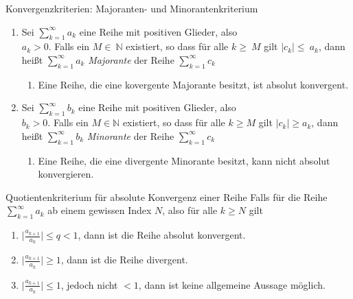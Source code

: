 \begin{karte}{Konvergenzkriterien: Majoranten- und Minorantenkriterium}
	\begin{enumerate}[label=\textbullet]

		\item Sei \(\sum_{k=1}^{\infty}a_k\) eine Reihe mit positiven Glieder, also \\ \( a_k > 0\). Falls ein \(M \in\ \mathbb{N}\) existiert, so dass für alle \(k \geq\ M\) gilt \(\lvert c_k\rvert \leq\ a_k\), dann heißt \(\sum_{k=1}^{\infty}a_k\) \emph{Majorante} der Reihe \(\sum_{k=1}^{\infty}c_k\)
		      \begin{enumerate}[label=\(\triangleright \)]
		      	\item Eine Reihe, die eine kovergente Majorante besitzt, ist absolut konvergent.
		      \end{enumerate}
		\item Sei \(\sum_{k=1}^{\infty}b_k\) eine Reihe mit positiven Glieder, also \\ \( b_k > 0\). Falls ein \(M \in \mathbb{N}\) existiert, so dass für alle \(k \geq M\) gilt \(\lvert c_k\rvert \geq a_k\), dann heißt \(\sum_{k=1}^{\infty}b_k\) \emph{Minorante} der Reihe \(\sum_{k=1}^{\infty}c_k\)
		      \begin{enumerate}[label=\(\triangleright \)]
		      	\item Eine Reihe, die eine divergente Minorante besitzt, kann nicht absolut konvergieren.
		      \end{enumerate}

	\end{enumerate}
\end{karte}

\begin{karte}{Quotientenkriterium für absolute Konvergenz einer Reihe}
	Falls für die Reihe \(\sum_{k=1}^{\infty}a_k\) ab einem gewissen Index \(N\), also für alle \( k \geq N\) gilt
	\begin{enumerate}[label=\(\triangleright \)]

		\item \(\lvert \frac{a_{k+1}}{a_k}\rvert \leq q < 1\), dann ist die Reihe absolut konvergent.

		\item \(\lvert \frac{a_{k+1}}{a_k}\rvert \geq  1\), dann ist die Reihe divergent.

		\item \(\lvert \frac{a_{k+1}}{a_k}\rvert \leq  1\), jedoch nicht \(<1\), dann ist keine allgemeine Aussage möglich.
	\end{enumerate}

\end{karte}

